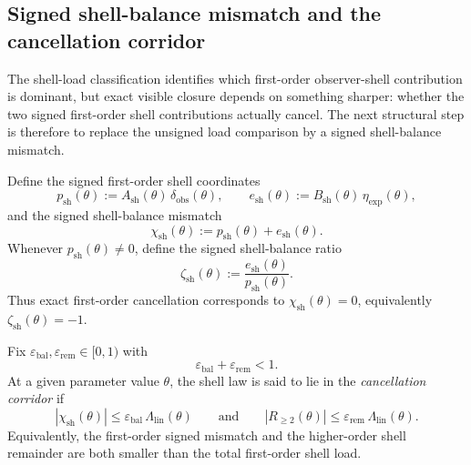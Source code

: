 \subsection*{Signed shell-balance mismatch and the cancellation corridor}
The shell-load classification identifies which first-order observer-shell contribution is dominant, but exact visible closure depends on something sharper: whether the two signed first-order shell contributions actually cancel. The next structural step is therefore to replace the unsigned load comparison by a signed shell-balance mismatch.

\begin{definition}
Define the signed first-order shell coordinates
\[
  p_{\mathrm{sh}}(\theta):=A_{\mathrm{sh}}(\theta)\,\delta_{\mathrm{obs}}(\theta),
  \qquad
  e_{\mathrm{sh}}(\theta):=B_{\mathrm{sh}}(\theta)\,\eta_{\mathrm{exp}}(\theta),
\]
and the signed shell-balance mismatch
\[
  \chi_{\mathrm{sh}}(\theta):=p_{\mathrm{sh}}(\theta)+e_{\mathrm{sh}}(\theta).
\]
Whenever $p_{\mathrm{sh}}(\theta)\neq 0$, define the signed shell-balance ratio
\[
  \zeta_{\mathrm{sh}}(\theta):=\frac{e_{\mathrm{sh}}(\theta)}{p_{\mathrm{sh}}(\theta)}.
\]
Thus exact first-order cancellation corresponds to $\chi_{\mathrm{sh}}(\theta)=0$, equivalently $\zeta_{\mathrm{sh}}(\theta)=-1$.
\end{definition}

\begin{definition}
Fix $\varepsilon_{\mathrm{bal}},\varepsilon_{\mathrm{rem}}\in[0,1)$ with
\[
  \varepsilon_{\mathrm{bal}}+\varepsilon_{\mathrm{rem}}<1.
\]
At a given parameter value $\theta$, the shell law is said to lie in the \emph{cancellation corridor} if
\[
  |\chi_{\mathrm{sh}}(\theta)|\le \varepsilon_{\mathrm{bal}}\,\Lambda_{\mathrm{lin}}(\theta)
  \qquad\text{and}\qquad
  |R_{\ge 2}(\theta)|\le \varepsilon_{\mathrm{rem}}\,\Lambda_{\mathrm{lin}}(\theta).
\]
Equivalently, the first-order signed mismatch and the higher-order shell remainder are both smaller than the total first-order shell load.
\end{definition}

